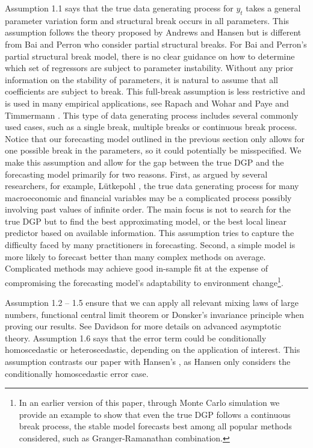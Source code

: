 Assumption 1.1 says that the true data generating process for $y_t$ takes a general parameter variation form and structural break occurs in all parameters. This assumption follows the theory proposed by Andrews and Hansen but is different from Bai and Perron who consider partial structural breaks. For Bai and Perron's \cite{bai_perron98} partial structural break model, there is no clear guidance on how to determine which set of regressors are subject to parameter instability. Without any prior information on the stability of parameters, it is natural to assume that all coefficients are subject to break. This full-break assumption is less restrictive and is used in many empirical applications, see Rapach and Wohar \cite{rapach_wohar_JFE2006} and Paye and Timmermann \cite{paye_timmermann_JEF2006}. This type of data generating process includes several commonly used cases, such as a single break, multiple breaks or continuous break process. Notice that our forecasting model outlined in the previous section only allows for one possible break in the parameters, so it could potentially be misspecified. We make this assumption and allow for the gap between the true DGP and the forecasting model primarily for two reasons. First, as argued by several researchers, for example, L\"{u}tkepohl \cite{lutkepohl_textbook}, the true data generating process for many macroeconomic and financial variables may be a complicated process possibly involving past values of infinite order. The main focus is not to search for the true DGP but to find the best approximating model, or the best local linear predictor based on available information. This assumption tries to capture the difficulty faced by many practitioners in forecasting. Second, a simple model is more likely to forecast better than many complex methods on average. Complicated methods may achieve good in-sample fit at the expense of compromising the forecasting model's adaptability to environment change\footnote{In an earlier version of this paper, through Monte Carlo simulation we provide an example to show that even the true DGP follows a continuous break process, the stable model forecasts best among all popular methods considered, such as Granger-Ramanathan combination.}.

Assumption 1.2 -- 1.5 ensure that we can apply all relevant mixing laws of large numbers, functional central limit theorem or Donsker's invariance principle when proving our results. See Davidson \cite{davidson_textbook} for more details on advanced asymptotic theory. Assumption 1.6 says that the error term could be conditionally homoscedastic or heteroscedastic, depending on the application of interest. This assumption contrasts our paper with Hansen's \cite{hansen2009averaging}, as Hansen only considers the conditionally homoscedastic error case.

